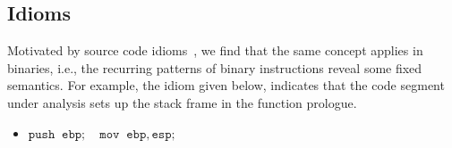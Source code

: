 

\subsection{Idioms} \label{subsec:idiom_ana}
Motivated by source code idioms~\cite{allamanis2014mining}, we find that the same concept applies in binaries, i.e., the recurring patterns of binary instructions reveal some fixed semantics.
For example, the idiom given below, indicates that the code segment under analysis sets up the stack frame in the function prologue.
\begin{itemize}
\centering
\itemsep-0.5em
  \item[] $\mathtt{push \;\;ebp; \quad mov \;\; ebp, esp;}$
\end{itemize}

